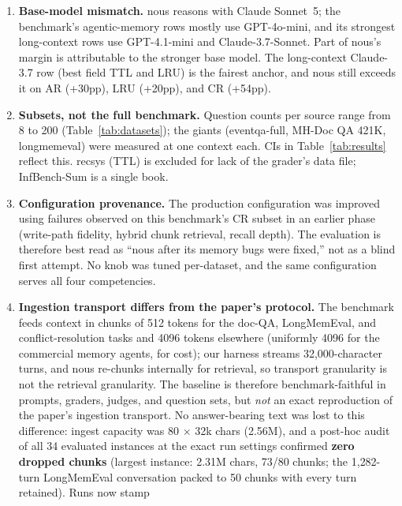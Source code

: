 \documentclass{article}
\newcommand{\nous}{\textsf{nous}}
\begin{document}
\begin{enumerate}
  \item \textbf{Base-model mismatch.} \nous{} reasons with Claude Sonnet~5;
        the benchmark's agentic-memory rows mostly use GPT-4o-mini, and its
        strongest long-context rows use GPT-4.1-mini and Claude-3.7-Sonnet.
        Part of \nous{}'s margin is attributable to the stronger base model.
        The long-context Claude-3.7 row (best field TTL and LRU) is the
        fairest anchor, and \nous{} still exceeds it on AR (+30pp), LRU
        (+20pp), and CR (+54pp).
  \item \textbf{Subsets, not the full benchmark.} Question counts per source
        range from 8 to 200 (Table~\ref{tab:datasets}); the giants
        (eventqa-full, MH-Doc QA 421K, longmemeval) were measured at one context
        each. CIs in Table~\ref{tab:results} reflect this. recsys (TTL) is
        excluded for lack of the grader's data file; InfBench-Sum is a single
        book.
  \item \textbf{Configuration provenance.} The production configuration was
        improved using failures observed on this benchmark's CR subset in an
        earlier phase (write-path fidelity, hybrid chunk retrieval, recall
        depth). The evaluation is therefore best read as ``\nous{} after its
        memory bugs were fixed,'' not as a blind first attempt. No knob was
        tuned per-dataset, and the same configuration serves all four
        competencies.
  \item \textbf{Ingestion transport differs from the paper's protocol.} The
        benchmark feeds context in chunks of 512 tokens for the doc-QA,
        LongMemEval, and conflict-resolution tasks and 4096 tokens elsewhere
        (uniformly 4096 for the commercial memory agents, for cost); our
        harness streams 32{,}000-character turns, and \nous{} re-chunks
        internally for retrieval, so transport granularity is not the
        retrieval granularity. The baseline is therefore benchmark-faithful in
        prompts, graders, judges, and question sets, but \emph{not} an exact
        reproduction of the paper's ingestion transport. No answer-bearing
        text was lost to this difference: ingest capacity was
        80 $\times$ 32k chars (2.56M), and a post-hoc audit of all 34
        evaluated instances at the exact run settings confirmed
        \textbf{zero dropped chunks} (largest instance: 2.31M chars, 73/80
        chunks; the 1{,}282-turn LongMemEval conversation packed to 50 chunks
        with every turn retained). Runs now stamp

\end{enumerate}
\end{document}
